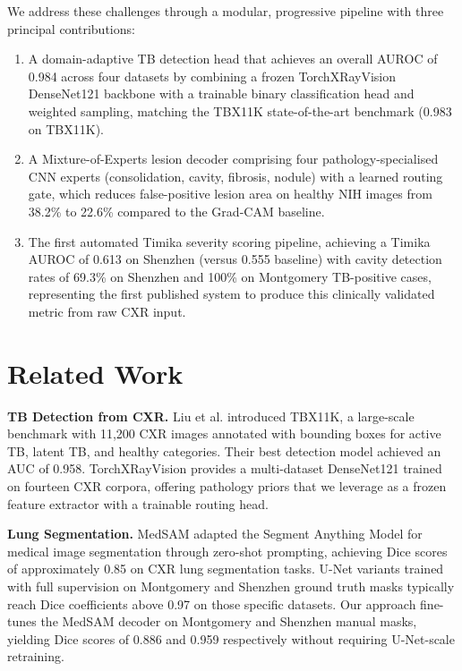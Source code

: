 \documentclass{article}
\begin{document}
We address these challenges through a modular, progressive pipeline with three principal contributions:

\begin{enumerate}
\item A domain-adaptive TB detection head that achieves an overall AUROC of 0.984 across four datasets by combining a frozen TorchXRayVision DenseNet121 \cite{cohen2022torchxrayvision} backbone with a trainable binary classification head and weighted sampling, matching the TBX11K state-of-the-art benchmark (0.983 on TBX11K).

\item A Mixture-of-Experts lesion decoder comprising four pathology-specialised CNN experts (consolidation, cavity, fibrosis, nodule) with a learned routing gate, which reduces false-positive lesion area on healthy NIH images from 38.2\% to 22.6\% compared to the Grad-CAM baseline.

\item The first automated Timika severity scoring pipeline, achieving a Timika AUROC of 0.613 on Shenzhen (versus 0.555 baseline) with cavity detection rates of 69.3\% on Shenzhen and 100\% on Montgomery TB-positive cases, representing the first published system to produce this clinically validated metric from raw CXR input.
\end{enumerate}

\section{Related Work}

\textbf{TB Detection from CXR.} Liu et al. \cite{liu2020tbx11k} introduced TBX11K, a large-scale benchmark with 11,200 CXR images annotated with bounding boxes for active TB, latent TB, and healthy categories. Their best detection model achieved an AUC of 0.958. TorchXRayVision \cite{cohen2022torchxrayvision} provides a multi-dataset DenseNet121 trained on fourteen CXR corpora, offering pathology priors that we leverage as a frozen feature extractor with a trainable routing head.

\textbf{Lung Segmentation.} MedSAM \cite{ma2024medsam} adapted the Segment Anything Model \cite{kirillov2023sam} for medical image segmentation through zero-shot prompting, achieving Dice scores of approximately 0.85 on CXR lung segmentation tasks. U-Net variants \cite{ronneberger2015unet} trained with full supervision on Montgomery and Shenzhen ground truth masks typically reach Dice coefficients above 0.97 on those specific datasets. Our approach fine-tunes the MedSAM decoder on Montgomery and Shenzhen manual masks, yielding Dice scores of 0.886 and 0.959 respectively without requiring U-Net-scale retraining.
\end{document}
